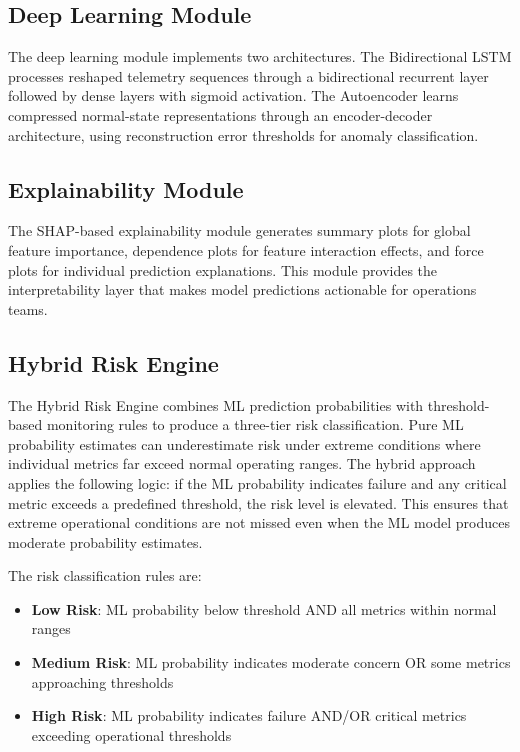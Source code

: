 \documentclass[12pt,letterpaper]{report}
\begin{document}
\subsection{Deep Learning Module}
The deep learning module implements two architectures. The Bidirectional LSTM processes reshaped telemetry sequences through a bidirectional recurrent layer followed by dense layers with sigmoid activation. The Autoencoder learns compressed normal-state representations through an encoder-decoder architecture, using reconstruction error thresholds for anomaly classification.

\subsection{Explainability Module}
The SHAP-based explainability module generates summary plots for global feature importance, dependence plots for feature interaction effects, and force plots for individual prediction explanations. This module provides the interpretability layer that makes model predictions actionable for operations teams.

\subsection{Hybrid Risk Engine}

The Hybrid Risk Engine combines ML prediction probabilities with threshold-based monitoring rules to produce a three-tier risk classification. Pure ML probability estimates can underestimate risk under extreme conditions where individual metrics far exceed normal operating ranges. The hybrid approach applies the following logic: if the ML probability indicates failure and any critical metric exceeds a predefined threshold, the risk level is elevated. This ensures that extreme operational conditions are not missed even when the ML model produces moderate probability estimates.

The risk classification rules are:
\begin{itemize}
  \item \textbf{Low Risk}: ML probability below threshold AND all metrics within normal ranges
  \item \textbf{Medium Risk}: ML probability indicates moderate concern OR some metrics approaching thresholds
  \item \textbf{High Risk}: ML probability indicates failure AND/OR critical metrics exceeding operational thresholds
\end{itemize}
\end{document}
